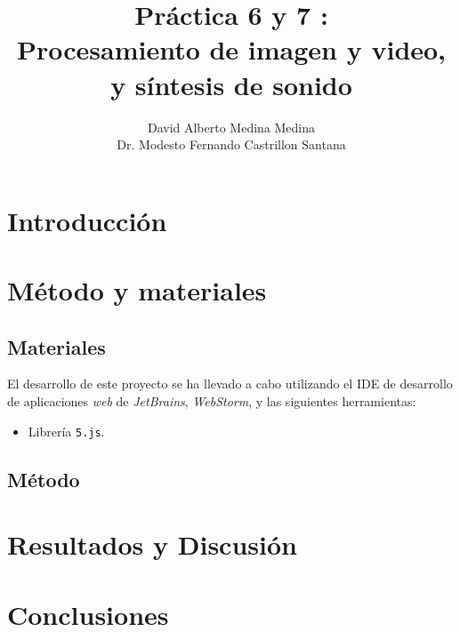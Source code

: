 \documentclass[10pt,a4paper]{report}
\author{David Alberto Medina Medina
	\\
	Dr. Modesto Fernando Castrillon Santana}
\title{Práctica 6 y 7 :\\ Procesamiento de imagen y video, \\y síntesis de sonido}
\begin{document}
	\maketitle
	\tableofcontents
	
	\chapter{Introducción}
	
	
	\chapter{Método y materiales}
	\section{Materiales}
	El desarrollo de este proyecto se ha llevado a cabo utilizando el IDE de desarrollo de aplicaciones \textit{web} de \textit{JetBrains}, \textit{WebStorm}, y las siguientes herramientas:
	\begin{itemize}
		\item Librería \texttt{5.js}.
	\end{itemize}
	
	\section{Método}
	
	
	\chapter{Resultados y Discusión}
	
		
	
	\chapter{Conclusiones}	
	
	
	
\end{document}
